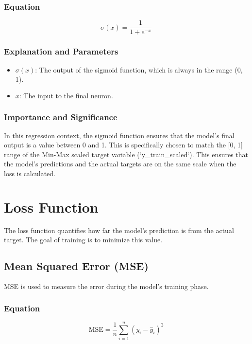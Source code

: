 \documentclass[12pt, a4paper]{article}
\begin{document}
\subsubsection{Equation}
\begin{equation}
\sigma(x) = \frac{1}{1 + e^{-x}}
\end{equation}

\subsubsection{Explanation and Parameters}
\begin{itemize}
    \item \textbf{$\sigma(x)$}: The output of the sigmoid function, which is always in the range (0, 1).
    \item \textbf{$x$}: The input to the final neuron.
\end{itemize}

\subsubsection{Importance and Significance}
In this regression context, the sigmoid function ensures that the model's final output is a value between 0 and 1. This is specifically chosen to match the [0, 1] range of the Min-Max scaled target variable (`y_train_scaled`). This ensures that the model's predictions and the actual targets are on the same scale when the loss is calculated.

\newpage
\section{Loss Function}
The loss function quantifies how far the model's prediction is from the actual target. The goal of training is to minimize this value.

\subsection{Mean Squared Error (MSE)}
MSE is used to measure the error during the model's training phase.

\subsubsection{Equation}
\begin{equation}
\text{MSE} = \frac{1}{n} \sum_{i=1}^{n} (y_i - \hat{y}_i)^2
\label{eq:mse}
\end{equation}
\end{document}
